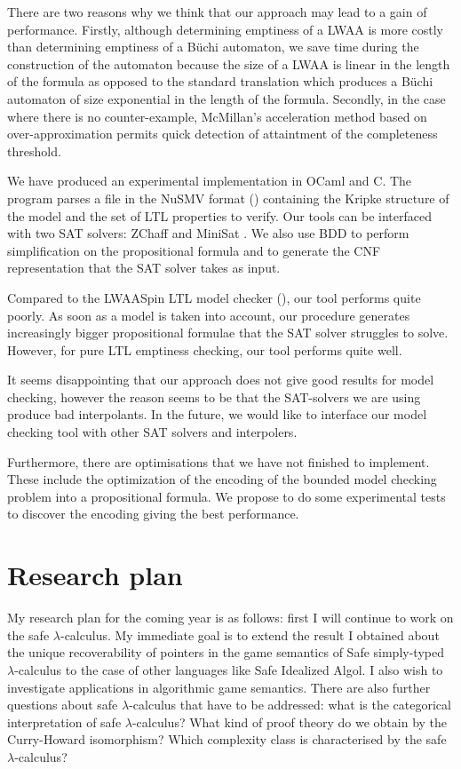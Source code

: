 There are two reasons why we think that our approach may lead to a
gain of performance. Firstly, although determining emptiness of a
LWAA is more costly than determining emptiness of a B\"uchi
automaton, we save time during the construction of the automaton
because the size of a LWAA is linear in the length of the formula as
opposed to the standard translation which produces a B\"uchi
automaton of size exponential in the length of the formula.
Secondly, in the case where there is no counter-example, McMillan's
acceleration method based on over-approximation permits quick
detection of attaintment of the completeness threshold.


We have produced an experimental implementation in OCaml and C. The
program parses a file in the NuSMV format (\cite{CAV02:nusmv})
containing the Kripke structure of the model and the set of LTL
properties to verify. Our tools can be interfaced with two SAT
solvers: ZChaff \citep{zChaff} and MiniSat \citep{ES03}. We also use
BDD to perform simplification on the propositional formula and to
generate the CNF representation that the SAT solver takes as input.

Compared to the LWAASpin LTL model checker (\cite{hammer:truly}),
our tool performs quite poorly. As soon as a model is taken into
account, our procedure generates increasingly bigger propositional
formulae that the SAT solver struggles to solve. However, for pure
LTL emptiness checking, our tool performs quite well.

It seems disappointing that our approach does not give good results
for model checking, however the reason seems to be that the
SAT-solvers we are using produce bad interpolants. In the future, we
would like to interface our model checking tool with other SAT
solvers and interpolers.

Furthermore, there are optimisations that we have not finished to
implement. These include the optimization of the encoding of the
bounded model checking problem into a propositional formula. We
propose to do some experimental tests to discover the encoding
giving the best performance.

\chapter{Research plan}

My research plan for the coming year is as follows: first I will
continue to work on the safe $\lambda$-calculus. My immediate goal
is to extend the result I obtained about the unique recoverability
of pointers in the game semantics of Safe simply-typed
$\lambda$-calculus to the case of other languages like Safe
Idealized Algol. I also wish to investigate applications in
algorithmic game semantics. There are also further questions about
safe $\lambda$-calculus that have to be addressed: what is the
categorical interpretation of safe $\lambda$-calculus? What kind of
proof theory do we obtain by the Curry-Howard isomorphism? Which
complexity class is characterised by the safe $\lambda$-calculus?

